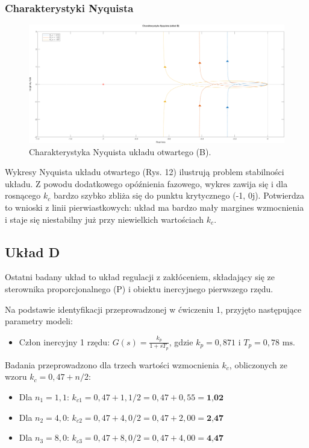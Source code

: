\documentclass[12pt,a4paper]{article}
\begin{document}
	\subsubsection{Charakterystyki Nyquista}
	
	\begin{figure}[H]
		\centering
		\includegraphics[width=0.8\linewidth]{zdjecia/NQ_ukladB.png}
		\caption{Charakterystyka Nyquista układu otwartego (B).}
		\label{fig:NQ_ukladB}
	\end{figure}
	
	Wykresy Nyquista układu otwartego (Rys. 12) ilustrują problem stabilności układu. Z powodu dodatkowego opóźnienia fazowego, wykres zawija się i dla rosnącego $k_c$ bardzo szybko zbliża się do punktu krytycznego (-1, 0j). Potwierdza to wnioski z linii pierwiastkowych: układ ma bardzo mały margines wzmocnienia i staje się niestabilny już przy niewielkich wartościach $k_c$.
	
	\subsection{Układ D}
	
	Ostatni badany układ to układ regulacji z zakłóceniem, składający się ze sterownika proporcjonalnego (P) i obiektu inercyjnego pierwszego rzędu.
	
	Na podstawie identyfikacji przeprowadzonej w ćwiczeniu 1, przyjęto następujące parametry modeli:
	\begin{itemize}
		\item Człon inercyjny 1 rzędu: $G(s) = \frac{k_p}{1+sT_p}$, gdzie $k_p = 0,871$ i $T_p = 0,78 \text{ ms}$.
	\end{itemize}
	
	Badania przeprowadzono dla trzech wartości wzmocnienia \(k_c\), obliczonych ze wzoru \(k_c = 0,47 + n/2\):
	\begin{itemize}
		\item Dla \(n_1 = 1,1\): $k_{c1} = 0,47 + 1,1 / 2 = 0,47 + 0,55 = \textbf{1,02}$
		\item Dla \(n_2 = 4,0\): $k_{c2} = 0,47 + 4,0 / 2 = 0,47 + 2,00 = \textbf{2,47}$
		\item Dla \(n_3 = 8,0\): $k_{c3} = 0,47 + 8,0 / 2 = 0,47 + 4,00 = \textbf{4,47}$
	\end{itemize}
	
\end{document}
